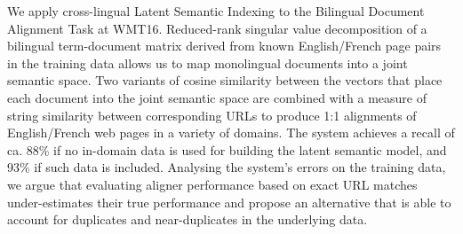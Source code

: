 We apply cross-lingual Latent Semantic Indexing to the Bilingual Document Alignment Task at WMT16. Reduced-rank singular value decomposition of a bilingual term-document matrix derived from known English/French page pairs in the training data allows us to map monolingual documents into a joint semantic space. Two variants of cosine similarity between the vectors that place each document into the joint semantic space are combined with a measure of string similarity between corresponding URLs to produce 1:1 alignments of English/French web pages in a variety of domains.  The system achieves a recall of ca. 88\% if no in-domain data is used for building the latent semantic model, and 93\% if such data is included. Analysing the system's errors on the training data, we argue that evaluating aligner performance based on exact URL matches under-estimates their true performance and propose an alternative that is able to account for duplicates and near-duplicates in the underlying data.
